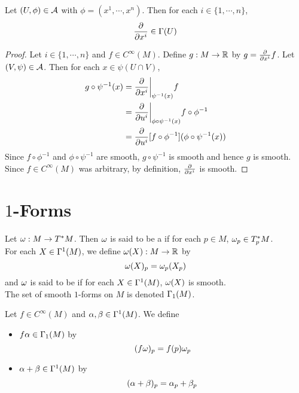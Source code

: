 \documentclass{book}
\begin{document}
	\begin{ex}
	Let $(U, \phi) \in \mathcal{A}$ with $\phi = (x^1, \cdots, x^n)$. Then for each $i \in \{1, \cdots, n\}$, $$\frac{\partial}{\partial x^i} \in \Gamma(U)$$
	\end{ex}
	
	\begin{proof}
	Let $i \in \{1, \cdots, n\}$ and $f \in C^{\infty}(M)$. Define $g: M \rightarrow \mathbb{R}$ by $g =\frac{\partial}{\partial x^i} f$. Let $(V, \psi) \in \mathcal{A}$. Then for each $x \in \psi(U \cap V)$, 
	\begin{align*}
	g \circ \psi^{-1}(x) 
	&= \frac{\partial}{\partial x^i} \bigg|_{\psi^{-1}(x)}f \\
	&= \frac{\partial}{\partial u^i} \bigg|_{\phi \circ \psi^{-1}(x)}f \circ \phi^{-1}  \\
	&= \frac{\partial}{\partial u^i}[f \circ \phi^{-1}] ( \phi \circ \psi^{-1} (x))\\
\end{align*}	 
	Since $f \circ \phi^{-1}$ and $\phi \circ \psi^{-1}$ are smooth, $g \circ \psi^{-1}$ is smooth and hence $g$ is smooth. Since $f \in C^{\infty}(M)$ was arbitrary, by definition, $\frac{\partial}{\partial x^i}$ is smooth. 
	\end{proof}
	
	
	
	
	
	
	
	\newpage
	\section{$1$-Forms}
	
	\begin{defn}
		Let $\omega: M \rightarrow T^*M$. Then $\omega$ is said to be a  if for each $p \in M$, $\omega_p \in T^*_p M$. \\
		For each $X \in \Gamma^1(M)$, we define $\omega(X) : M \rightarrow \mathbb{R}$ by $$\omega(X)_p = \omega_p(X_p)$$
		and $\omega$ is said to be  if for each $X \in \Gamma^1(M)$, $\omega(X)$ is smooth. \\
		The set of smooth $1$-forms on $M$ is denoted $\Gamma_1(M)$.\\
	\end{defn}

	\begin{defn}
	Let $f \in C^{\infty}(M)$ and $\alpha,\beta \in \Gamma^1(M)$. We define 
	\begin{itemize}
	\item $f\alpha \in \Gamma_1(M)$ by $$(f\omega)_p = f(p)\omega_p$$
	\item $\alpha+\beta \in \Gamma^1(M)$ by $$(\alpha+\beta)_p = \alpha_p+\beta_p$$
	\end{itemize}
	\end{defn}
	
\end{document}
